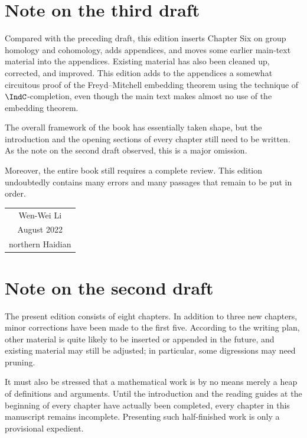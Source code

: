 \section*{Note on the third draft}
Compared with the preceding draft, this edition inserts Chapter Six on group
homology and cohomology, adds appendices, and moves some earlier main-text
material into the appendices. Existing material has also been cleaned up,
corrected, and improved. This edition adds to the appendices a somewhat
circuitous proof of the Freyd--Mitchell embedding theorem using the technique
of $\IndC$-completion, even though the main text makes almost no use of the
embedding theorem.

The overall framework of the book has essentially taken shape, but the
introduction and the opening sections of every chapter still need to be
written. As the note on the second draft observed, this is a major omission.

Moreover, the entire book still requires a complete review. This edition
undoubtedly contains many errors and many passages that remain to be put in
order.

\vspace{1em}
\begin{flushright}\begin{minipage}{0.3 \textwidth}
  \begin{tabular}{c}
    Wen-Wei Li \\
    August 2022 \\
    northern Haidian
  \end{tabular}
\end{minipage}\end{flushright}
\vspace{1em}

\section*{Note on the second draft}
The present edition consists of eight chapters. In addition to three new
chapters, minor corrections have been made to the first five. According to the
writing plan, other material is quite likely to be inserted or appended in the
future, and existing material may still be adjusted; in particular, some
digressions may need pruning.

It must also be stressed that a mathematical work is by no means merely a heap
of definitions and arguments. Until the introduction and the reading guides at
the beginning of every chapter have actually been completed, every chapter in
this manuscript remains incomplete. Presenting such half-finished work is only
a provisional expedient.

